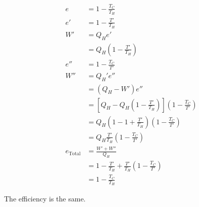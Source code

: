 \documentclass{article}
\begin{document}
\begin{align*}
  e              & = 1 - \frac{T_C}{T_H}                                                                          \\
  e'             & = 1 - \frac{T'}{T_H}                                                                           \\
  W'             & = Q_H e'                                                                                       \\
                 & = Q_H \left( 1 - \frac{T'}{T_H} \right)                                                        \\
  e''            & = 1 - \frac{T_C}{T'}                                                                           \\
  W''            & = Q_H' e''                                                                                     \\
                 & = (Q_H - W') e''                                                                               \\
                 & = \left[ Q_H - Q_H \left( 1 - \frac{T'}{T_H} \right) \right] \left( 1 - \frac{T_C}{T'} \right) \\
                 & = Q_H \left( 1 - 1 + \frac{T'}{T_H} \right) \left( 1 - \frac{T_C}{T'} \right)                  \\
                 & = Q_H \frac{T'}{T_H} \left( 1 - \frac{T_C}{T'} \right)                                         \\
  e_\text{Total} & = \frac{W' + W''}{Q_H}                                                                         \\
                 & = 1 - \frac{T'}{T_H} + \frac{T'}{T_H} \left( 1 - \frac{T_C}{T'} \right)                        \\
                 & = 1 - \frac{T_C}{T_H}
\end{align*}

The efficiency is the same.

\setcounter{subsubsection}{48}
\subsubsection{}
\end{document}

